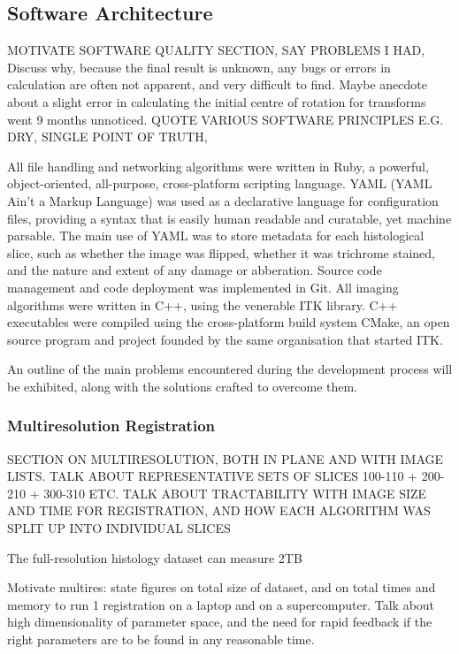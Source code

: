   \subsection{Software Architecture} %
  \label{sub:software_architecture}
    MOTIVATE SOFTWARE QUALITY SECTION, SAY PROBLEMS I HAD, Discuss why, because the final result is unknown, any bugs or errors in calculation are often not apparent, and very difficult to find. Maybe anecdote about a slight error in calculating the initial centre of rotation for transforms went 9 months unnoticed. QUOTE VARIOUS SOFTWARE PRINCIPLES E.G. DRY, SINGLE POINT OF TRUTH,

    All file handling and networking algorithms were written in Ruby, a powerful, object-oriented, all-purpose, cross-platform scripting language. YAML (YAML Ain't a Markup Language) was used as a declarative language for configuration files, providing a syntax that is easily human readable and curatable, yet machine parsable. The main use of YAML was to store metadata for each histological slice, such as whether the image was flipped, whether it was trichrome stained, and the nature and extent of any damage or abberation. Source code management and code deployment was implemented in Git. All imaging algorithms were written in C++, using the venerable ITK library. C++ executables were compiled using the cross-platform build system CMake, an open source program and project founded by the same organisation that started ITK.
    
    An outline of the main problems encountered during the development process will be exhibited, along with the solutions crafted to overcome them.
    
    \subsubsection{Multiresolution Registration} %
    \label{ssub:multiresolution_registration}
      SECTION ON MULTIRESOLUTION, BOTH IN PLANE AND WITH IMAGE LISTS. TALK ABOUT REPRESENTATIVE SETS OF SLICES 100-110 + 200-210 + 300-310 ETC. TALK ABOUT TRACTABILITY WITH IMAGE SIZE AND TIME FOR REGISTRATION, AND HOW EACH ALGORITHM WAS SPLIT UP INTO INDIVIDUAL SLICES
      
	  The full-resolution histology dataset can measure 2TB
	  
      Motivate multires: state figures on total size of dataset, and on total times and memory to run 1 registration on a laptop and on a supercomputer. Talk about high dimensionality of parameter space, and the need for rapid feedback if the right parameters are to be found in any reasonable time.
    
